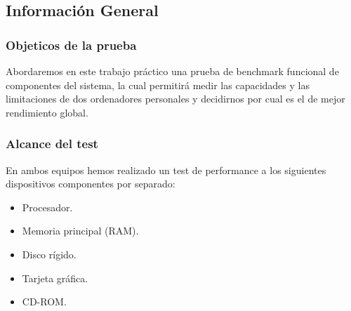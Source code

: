 \subsection{Información General}

\subsubsection{Objeticos de la prueba}
Abordaremos en este trabajo práctico una prueba de benchmark funcional de
componentes del sistema, la cual permitirá medir las capacidades y las
limitaciones de dos ordenadores personales y decidirnos por cual es el de mejor
rendimiento global.

\subsubsection{Alcance del test}
En ambos equipos hemos realizado un test de performance a los siguientes
dispositivos componentes por separado:

\begin{itemize}
  \item Procesador.
  \item Memoria principal (RAM).
  \item Disco rígido.
  \item Tarjeta gráfica.
  \item CD-ROM.
\end{itemize}

